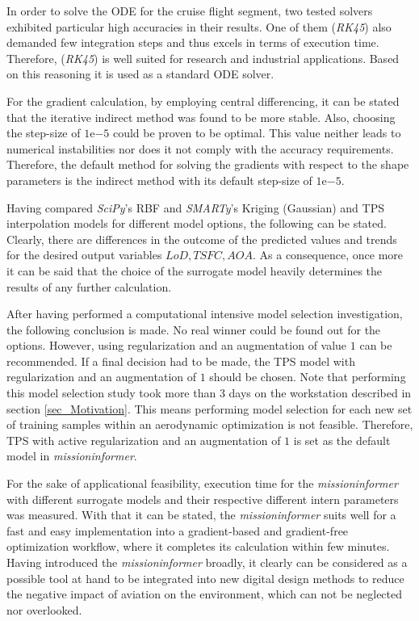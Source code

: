 In order to solve the ODE for the cruise flight segment, two tested solvers exhibited 
particular high accuracies in their results. One of them (\emph{RK45}) also 
demanded few integration steps and thus excels 
in terms of execution time. Therefore, 
(\emph{RK45}) is well suited for research and industrial applications.
Based on this reasoning it is used as a standard ODE solver.\newline


For the gradient calculation, by employing central differencing, 
it can be stated that the iterative indirect method was found to be more
stable. Also, choosing the step-size of $1\mathrm{e}{-5}$ 
could be proven to be optimal. 
This value neither
leads to numerical instabilities nor does it 
not comply with the accuracy requirements.
Therefore, the default method for solving the gradients
with respect to the shape parameters
is the indirect method with its default step-size of $1\mathrm{e}{-5}$.\newline 

Having compared \emph{SciPy}'s RBF and \emph{SMARTy}'s Kriging (Gaussian)
and TPS
interpolation models for different model options, the following can be stated.
Clearly, there are differences in the
outcome of the predicted values and trends for the
desired output variables $LoD, TSFC , AOA$.
As a consequence, once more it can be said that 
the choice of the surrogate model heavily
determines the results of any further calculation. \newline

After having performed a computational intensive 
model selection investigation, the following 
conclusion is made.
No real winner 
could be found out for the options. However, 
using regularization and an augmentation 
of value $1$ can be recommended. If a final 
decision had to be made,
the TPS model with regularization
and an augmentation of $1$ should be chosen.
Note that performing this model selection study 
took more than 3 days on the workstation described 
in section \ref{sec_Motivation}.
This means performing
model selection for each new set of training samples 
within an aerodynamic optimization 
is not feasible. Therefore, TPS with 
active regularization and an augmentation 
of $1$ is set as the default model 
in \emph{missioninformer}.\newline

For the sake 
of applicational feasibility, execution time for the \emph{missioninformer}
with different surrogate models and their respective 
different intern parameters was measured. 
With that it can be stated, the \emph{missioninformer}
suits well for a fast and easy implementation 
into a gradient-based and gradient-free 
optimization workflow, where it completes 
its calculation within few minutes. 
Having introduced the \emph{missioninformer} broadly, 
it clearly can be considered as a possible tool 
at hand to be integrated into new digital design methods 
to reduce the 
negative impact of aviation on the environment, which 
can not be neglected nor overlooked.
 

